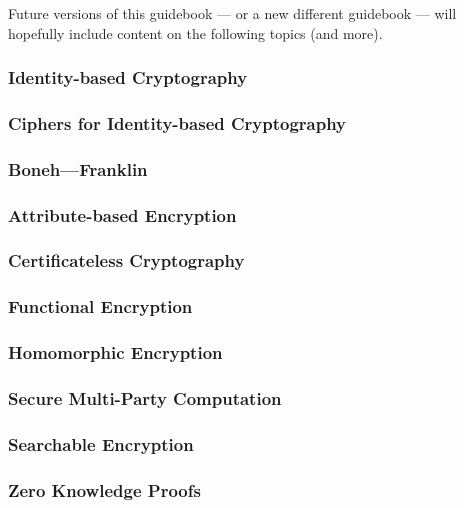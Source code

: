 Future versions of this guidebook --- or a new different guidebook --- will hopefully include content on the following topics (and more).

\subsubsection{Identity-based Cryptography}\label{future_sec:identity_based_cryptography}
\subsubsection{Ciphers for Identity-based Cryptography}\label{future_sec:identity_based_cryptography:ciphers}
\subsubsection{Boneh---Franklin}\label{future_sec:identity_based_cryptography:ciphers:boneh_franklin}
\subsubsection{Attribute-based Encryption}\label{future_sec:advanced_cryptography:attribute_based_encryption}
\subsubsection{Certificateless Cryptography}\label{future_sec:asymmetric_cryptography:certificateless}
\subsubsection{Functional Encryption}\label{future_sec:advanced_cryptography:functional_encryption}
\subsubsection{Homomorphic Encryption}\label{future_sec:advanced_cryptography:homomorphic_encryption}
\subsubsection{Secure Multi-Party Computation}\label{future_sec:advanced_cryptography:secure_multi_party_computation}
\subsubsection{Searchable Encryption}\label{future_sec:advanced_cryptography:searchable_encryption}
\subsubsection{Zero Knowledge Proofs}\label{future_sec:advanced_cryptography:zero_knowledge_proofs}


